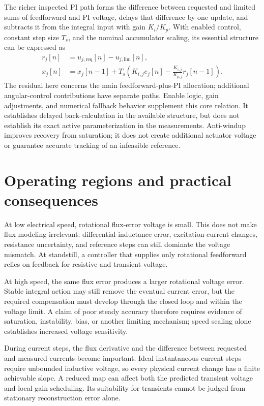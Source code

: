 The richer inspected PI path forms the difference between requested and limited sums of feedforward and PI voltage, delays that difference by one update, and subtracts it from the integral input with gain $K_i/K_p$. With enabled control, constant step size $T_s$, and the nominal accumulator scaling, its essential structure can be expressed as
\begin{align}
 r_j[n]&=u_{j,\mathrm{req}}[n]-u_{j,\mathrm{lim}}[n],\\
 x_j[n]&=x_j[n-1]+T_s\left(
 K_{i,j}e_j[n]-\frac{K_{i,j}}{K_{p,j}}r_j[n-1]\right).
 \label{eq:control-aw-inspected}
\end{align}
The residual here concerns the main feedforward-plus-PI allocation; additional angular-control contributions have separate paths. Enable logic, gain adjustments, and numerical fallback behavior supplement this core relation. It establishes delayed back-calculation in the available structure, but does not establish its exact active parameterization in the measurements. Anti-windup improves recovery from saturation; it does not create additional actuator voltage or guarantee accurate tracking of an infeasible reference.

\section{Operating regions and practical consequences}

At low electrical speed, rotational flux-error voltage is small. This does not make flux modeling irrelevant: differential-inductance error, excitation-current changes, resistance uncertainty, and reference steps can still dominate the voltage mismatch. At standstill, a controller that supplies only rotational feedforward relies on feedback for resistive and transient voltage.

At high speed, the same flux error produces a larger rotational voltage error. Stable integral action may still remove the eventual current error, but the required compensation must develop through the closed loop and within the voltage limit. A claim of poor steady accuracy therefore requires evidence of saturation, instability, bias, or another limiting mechanism; speed scaling alone establishes increased voltage sensitivity.

During current steps, the flux derivative and the difference between requested and measured currents become important. Ideal instantaneous current steps require unbounded inductive voltage, so every physical current change has a finite achievable slope. A reduced map can affect both the predicted transient voltage and local gain scheduling. Its suitability for transients cannot be judged from stationary reconstruction error alone.

